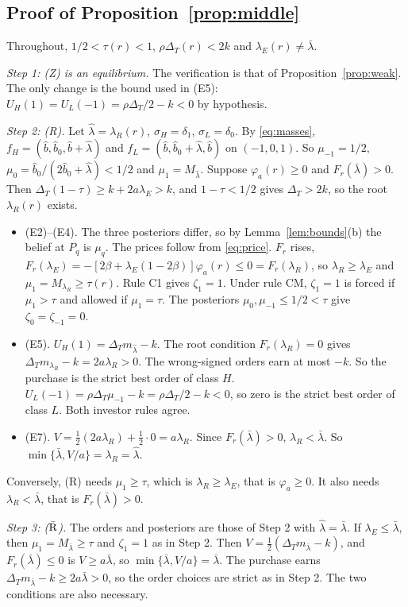 \documentclass[12pt]{article}
\theoremstyle{definition}
\theoremstyle{remark}
\newcommand{\DT}{\Delta_T}
\newcommand{\lh}{\hat\lambda}
\newcommand{\lb}{\bar\lambda}
\begin{document}
\subsection{Proof of Proposition~\ref{prop:middle}}

Throughout, $1/2<\tau(r)<1$, $\rho\DT(r)<2k$ and $\lambda_E(r)\ne\lb$.

\emph{Step 1: (Z) is an equilibrium.} The verification is that of Proposition~\ref{prop:weak}. The only change is
the bound used in (E5): $U_H(1)=U_L(-1)=\rho\DT/2-k<0$ by hypothesis.

\emph{Step 2: (R).} Let $\lh=\lambda_R(r)$, $\sigma_H=\delta_1$, $\sigma_L=\delta_0$. By \eqref{eq:masses},
$f_H=(\hat b,\hat b_0,\hat b+\lh)$ and $f_L=(\hat b,\hat b_0+\lh,\hat b)$ on $(-1,0,1)$. So
$\mu_{-1}=1/2$, $\mu_0=\hat b_0/(2\hat b_0+\lh)<1/2$ and $\mu_1=M_{\lh}$. Suppose $\varphi_a(r)\ge0$ and $F_r(\lb)>0$.
Then $\DT(1-\tau)\ge k+2a\lambda_E>k$, and $1-\tau<1/2$ gives $\DT>2k$, so the root $\lambda_R(r)$ exists.
\begin{itemize}[nosep]
\item (E2)--(E4). The three posteriors differ, so by Lemma~\ref{lem:bounds}(b) the belief at $P_q$ is $\mu_q$.
  The prices follow from \eqref{eq:price}. $F_r$ rises, $F_r(\lambda_E)=-[2\beta+\lambda_E(1-2\beta)]\varphi_a(r)\le0=F_r(\lambda_R)$, so
  $\lambda_R\ge\lambda_E$ and $\mu_1=M_{\lambda_R}\ge\tau(r)$. Rule C1 gives $\zeta_1=1$. Under rule CM, $\zeta_1=1$ is
  forced if $\mu_1>\tau$ and allowed if $\mu_1=\tau$. The posteriors $\mu_0,\mu_{-1}\le1/2<\tau$ give
  $\zeta_0=\zeta_{-1}=0$.
\item (E5). $U_H(1)=\DT m_{\lh}-k$. The root condition $F_r(\lambda_R)=0$ gives $\DT m_{\lambda_R}-k=2a\lambda_R>0$.
  The wrong-signed orders earn at most $-k$. So the purchase is the strict best order of class $H$.
  $U_L(-1)=\rho\DT\mu_{-1}-k=\rho\DT/2-k<0$, so zero is the strict best order of class $L$. Both investor rules agree.
\item (E7). $V=\frac12(2a\lambda_R)+\frac12\cdot0=a\lambda_R$. Since $F_r(\lb)>0$, $\lambda_R<\lb$. So
  $\min\{\lb,V/a\}=\lambda_R=\lh$.
\end{itemize}
Conversely, (R) needs $\mu_1\ge\tau$, which is $\lambda_R\ge\lambda_E$, that is $\varphi_a\ge0$. It also needs
$\lambda_R<\lb$, that is $F_r(\lb)>0$.

\emph{Step 3: ($\bar{\rm R}$).} The orders and posteriors are those of Step 2 with $\lh=\lb$. If $\lambda_E\le\lb$, then
$\mu_1=M_{\lb}\ge\tau$ and $\zeta_1=1$ as in Step 2. Then $V=\frac12(\DT m_{\lb}-k)$, and $F_r(\lb)\le0$ is
$V\ge a\lb$, so $\min\{\lb,V/a\}=\lb$. The purchase earns $\DT m_{\lb}-k\ge2a\lb>0$, so the order choices are strict as in
Step 2. The two conditions are also necessary.
\end{document}

